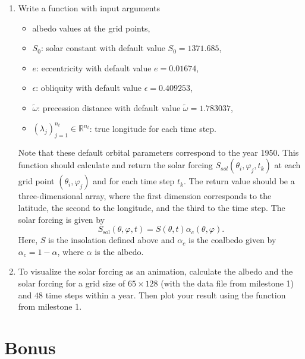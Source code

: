 \documentclass[10pt]{scrartcl}
\newcommand{\lat}{\theta}
\begin{document}
\begin{enumerate}
\item[5.] Write a function \small\texttt{} \normalsize with input arguments
\begin{itemize}
	\item albedo values at the grid points,
	\item $S_0$: solar constant with default value $S_0 = 1371.685$,
	\item $e$: eccentricity with default value $e = 0.01674$,
	\item $\epsilon$: obliquity with default value $\epsilon  = 0.409253$,
	\item $\tilde \omega$: precession distance with default value $\tilde \omega = 1.783037$,
	\item $\left(\lambda_j\right)_{j = 1}^{n_t} \in \mathbb{R}^{n_t}$: true longitude for each time step.
\end{itemize}

Note that these default orbital parameters correspond to the year 1950.
This function should calculate and return the solar forcing $S_{sol}(\lat_i,\varphi_j,t_k)$ at each grid point $(\lat_i, \varphi_j)$ and for each time step $t_k$.
The return value should be a three-dimensional array, where the first dimension corresponds to the latitude, the second to the longitude, and the third to the time step.
The solar forcing is given by
\begin{equation*}
	S_\text{sol}\left(\lat,\varphi,t\right) = S\left(\lat,t\right)\alpha_c\left(\lat,\varphi\right).
\end{equation*}
Here, $S$ is the insolation defined above and $\alpha_c$ is the coalbedo given by $\alpha_c = 1 - \alpha$, where $\alpha$ is the albedo.


\item[6.] To visualize the solar forcing as an animation, calculate the albedo and the solar forcing for a grid size of $65 \times 128$ (with the data file from milestone 1) and $48$ time steps within a year. Then plot your result using the function
\small\texttt{} \normalsize from milestone 1.


\end{enumerate}


%
\section{Bonus}
\end{document}
